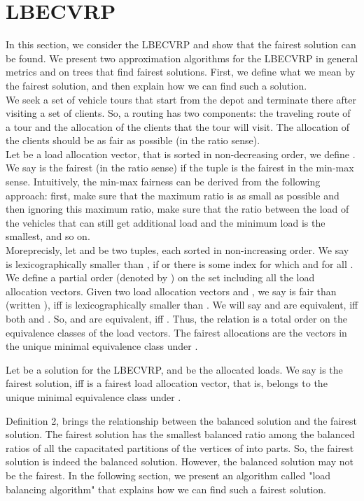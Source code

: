 \section{LBECVRP}
\noindent In this section, we consider the LBECVRP and show that the fairest solution can be found. We present two approximation algorithms for the LBECVRP in general metrics and on trees that find fairest solutions. First, we define what we mean by the fairest solution, and then explain how we can find such a solution.\\
\indent We seek a set of vehicle tours that start from the depot and terminate there after visiting a set of clients. So, a routing has two components: the traveling route of a tour and the allocation of the clients that the tour will visit. The allocation of the clients should be as fair as possible (in the ratio sense). \\
\indent Let  be a load allocation vector, that is sorted in non-decreasing order, we define . We say  is the fairest (in the ratio sense) if the tuple  is the fairest in the min-max sense. Intuitively, the min-max fairness can be derived from the following approach: first, make sure that the maximum ratio is as small as possible and then ignoring this maximum ratio, make sure that the ratio between the load of the vehicles that can still get additional load and the minimum load is the smallest, and so on.\\
\indent Moreprecisly, let  and  be two tuples, each sorted in non-increasing order. We say  is lexicographically smaller than , if  or there is some index  for which  and  for all . We define a partial order (denoted by ) on the set including all the load allocation vectors. Given two load allocation vectors  and , we say  is fair than  (written ), iff  is lexicographically smaller than . We will say  and  are equivalent, iff both  and . So,  and  are equivalent, iff . Thus, the relation  is a total order on the equivalence classes of the load vectors. The fairest allocations are the vectors in the unique minimal equivalence class under . 
\begin{definition} Let  be a solution for the LBECVRP, and  be the allocated loads. We say  is the fairest solution, iff  is a fairest load allocation vector, that is,  belongs to the unique minimal equivalence class under .
\end{definition} 

\indent Definition 2, brings the relationship between the balanced solution and the fairest solution. The fairest solution has the smallest balanced ratio among the balanced ratios of all the capacitated partitions of the vertices of  into  parts. So, the fairest solution is indeed the balanced solution. However, the balanced solution may not be the fairest. In the following section, we present an algorithm called "load balancing algorithm" that explains how we can find such a fairest solution.  
